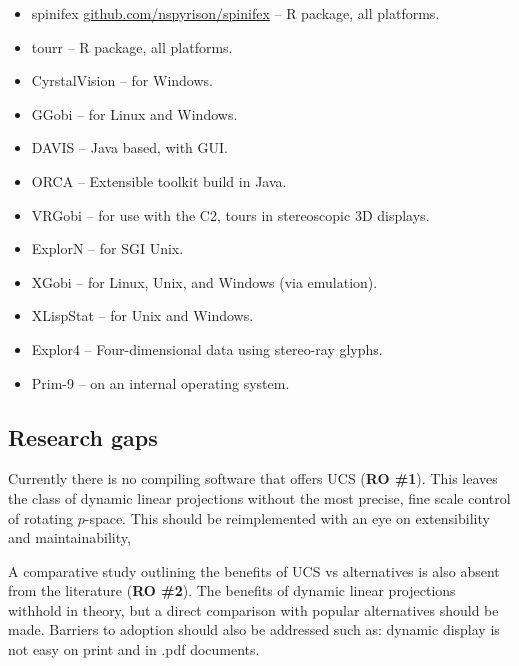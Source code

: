 \documentclass{monashthesis}
\begin{document}
\begin{itemize}
\tightlist
\item
  spinifex
  \href{https://github.com/nspyrison/spinifex}{github.com/nspyrison/spinifex}
  -- R package, all platforms.
\item
  tourr \autocite{wickham_tourr_2011} -- R package, all platforms.
\item
  CyrstalVision \autocite{wegman_visual_2003} -- for Windows.
\item
  GGobi \autocite{swayne_ggobi:_2003} -- for Linux and Windows.
\item
  DAVIS \autocite{huh_davis:_2002} -- Java based, with GUI.
\item
  ORCA \autocite{sutherland_orca:_2000} -- Extensible toolkit build in
  Java.
\item
  VRGobi \autocite{nelson_xgobi_1998} -- for use with the C2, tours in
  stereoscopic 3D displays.
\item
  ExplorN \autocite{carr_explorn:_1996} -- for SGI Unix.
\item
  XGobi \autocite{swayne_xgobi:_1991} -- for Linux, Unix, and Windows
  (via emulation).
\item
  XLispStat \autocite{tierney_lisp-stat:_1990} -- for Unix and Windows.
\item
  Explor4 \autocite{carr_explor4:_1988} -- Four-dimensional data using
  stereo-ray glyphs.
\item
  Prim-9 \autocites{asimov_grand_1985}{fisherkeller_prim-9:_1974} -- on
  an internal operating system.
\end{itemize}

\subsection{Research gaps}\label{research-gaps}

Currently there is no compiling software that offers UCS (\textbf{RO
\#1}). This leaves the class of dynamic linear projections without the
most precise, fine scale control of rotating \(p\)-space. This should be
reimplemented with an eye on extensibility and maintainability,

A comparative study outlining the benefits of UCS vs alternatives is
also absent from the literature (\textbf{RO \#2}). The benefits of
dynamic linear projections withhold in theory, but a direct comparison
with popular alternatives should be made. Barriers to adoption should
also be addressed such as: dynamic display is not easy on print and in
.pdf documents.
\end{document}
